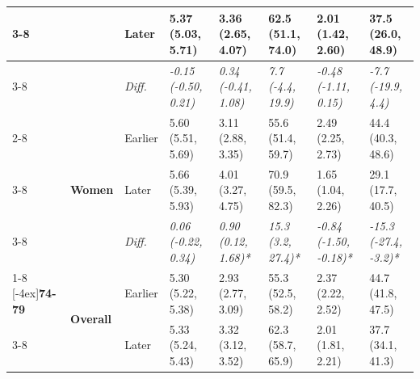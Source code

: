 \documentclass[12pt, a4paper]{article}
\begin{document}
\begin{appendices}
\begin{table}[!p]
{\begin{tabular}[t]{>{}l>{}lllllll}
        \cmidrule{3-8}
                                              &                                   & Later                         & 5.37 (5.03, 5.71)                           & 3.36 (2.65, 4.07)                            & 62.5 (51.1, 74.0)                           & 2.01 (1.42, 2.60)                               & 37.5 (26.0, 48.9)                              \\
        \cmidrule{3-8}
                                              &                                   & \cellcolor{gray!10}\em{Diff.} & \cellcolor{gray!10}\em{-0.15 (-0.50, 0.21)} & \cellcolor{gray!10}\em{0.34 (-0.41, 1.08)}   & \cellcolor{gray!10}\em{7.7 (-4.4, 19.9)}    & \cellcolor{gray!10}\em{-0.48 (-1.11, 0.15)}     & \cellcolor{gray!10}\em{-7.7 (-19.9, 4.4)}      \\
        \cmidrule{2-8}
                                              & \multirow{3}{*}{\textbf{Women}}   & Earlier                       & 5.60 (5.51, 5.69)                           & 3.11 (2.88, 3.35)                            & 55.6 (51.4, 59.7)                           & 2.49 (2.25, 2.73)                               & 44.4 (40.3, 48.6)                              \\
        \cmidrule{3-8}
                                              &                                   & Later                         & 5.66 (5.39, 5.93)                           & 4.01 (3.27, 4.75)                            & 70.9 (59.5, 82.3)                           & 1.65 (1.04, 2.26)                               & 29.1 (17.7, 40.5)                              \\
        \cmidrule{3-8}
                                              &                                   & \cellcolor{gray!10}\em{Diff.} & \cellcolor{gray!10}\em{0.06 (-0.22, 0.34)}  & \cellcolor{gray!10}\em{0.90 (0.12, 1.68)*}   & \cellcolor{gray!10}\em{15.3 (3.2, 27.4)*}   & \cellcolor{gray!10}\em{-0.84 (-1.50, -0.18)*}   & \cellcolor{gray!10}\em{-15.3 (-27.4, -3.2)*}   \\
        \cmidrule{1-8}
        \multirow{9}{*}[-4ex]{\textbf{74-79}} & \multirow{3}{*}{\textbf{Overall}} & Earlier                       & 5.30 (5.22, 5.38)                           & 2.93 (2.77, 3.09)                            & 55.3 (52.5, 58.2)                           & 2.37 (2.22, 2.52)                               & 44.7 (41.8, 47.5)                              \\
        \cmidrule{3-8}
                                              &                                   & Later                         & 5.33 (5.24, 5.43)                           & 3.32 (3.12, 3.52)                            & 62.3 (58.7, 65.9)                           & 2.01 (1.81, 2.21)                               & 37.7 (34.1, 41.3)                              \\

\end{tabular}}
\end{table}
\end{appendices}
\end{document}
